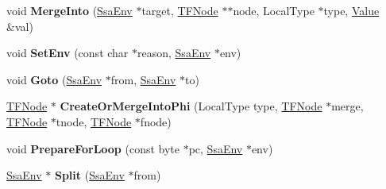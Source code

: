 \begin{DoxyCompactItemize}
\item 
void {\bfseries Merge\+Into} (\hyperlink{structv8_1_1internal_1_1wasm_1_1_ssa_env}{Ssa\+Env} $\ast$target, \hyperlink{classv8_1_1internal_1_1compiler_1_1_node}{T\+F\+Node} $\ast$$\ast$node, Local\+Type $\ast$type, \hyperlink{structv8_1_1internal_1_1wasm_1_1_value}{Value} \&val)\hypertarget{classv8_1_1internal_1_1wasm_1_1_s_r___wasm_decoder_a4cdc5f1be0f8b1665ae6cc0359b4a018}{}\label{classv8_1_1internal_1_1wasm_1_1_s_r___wasm_decoder_a4cdc5f1be0f8b1665ae6cc0359b4a018}

\item 
void {\bfseries Set\+Env} (const char $\ast$reason, \hyperlink{structv8_1_1internal_1_1wasm_1_1_ssa_env}{Ssa\+Env} $\ast$env)\hypertarget{classv8_1_1internal_1_1wasm_1_1_s_r___wasm_decoder_ac2c02325fd90668338166277f3f9b065}{}\label{classv8_1_1internal_1_1wasm_1_1_s_r___wasm_decoder_ac2c02325fd90668338166277f3f9b065}

\item 
void {\bfseries Goto} (\hyperlink{structv8_1_1internal_1_1wasm_1_1_ssa_env}{Ssa\+Env} $\ast$from, \hyperlink{structv8_1_1internal_1_1wasm_1_1_ssa_env}{Ssa\+Env} $\ast$to)\hypertarget{classv8_1_1internal_1_1wasm_1_1_s_r___wasm_decoder_a0c689e89f5fa08b5da3d5e004c7c4aac}{}\label{classv8_1_1internal_1_1wasm_1_1_s_r___wasm_decoder_a0c689e89f5fa08b5da3d5e004c7c4aac}

\item 
\hyperlink{classv8_1_1internal_1_1compiler_1_1_node}{T\+F\+Node} $\ast$ {\bfseries Create\+Or\+Merge\+Into\+Phi} (Local\+Type type, \hyperlink{classv8_1_1internal_1_1compiler_1_1_node}{T\+F\+Node} $\ast$merge, \hyperlink{classv8_1_1internal_1_1compiler_1_1_node}{T\+F\+Node} $\ast$tnode, \hyperlink{classv8_1_1internal_1_1compiler_1_1_node}{T\+F\+Node} $\ast$fnode)\hypertarget{classv8_1_1internal_1_1wasm_1_1_s_r___wasm_decoder_a79b5dfa65110dc17b14c0232b1ba75a1}{}\label{classv8_1_1internal_1_1wasm_1_1_s_r___wasm_decoder_a79b5dfa65110dc17b14c0232b1ba75a1}

\item 
void {\bfseries Prepare\+For\+Loop} (const byte $\ast$pc, \hyperlink{structv8_1_1internal_1_1wasm_1_1_ssa_env}{Ssa\+Env} $\ast$env)\hypertarget{classv8_1_1internal_1_1wasm_1_1_s_r___wasm_decoder_a8e0beb95cf55eefa06092966653c5187}{}\label{classv8_1_1internal_1_1wasm_1_1_s_r___wasm_decoder_a8e0beb95cf55eefa06092966653c5187}

\item 
\hyperlink{structv8_1_1internal_1_1wasm_1_1_ssa_env}{Ssa\+Env} $\ast$ {\bfseries Split} (\hyperlink{structv8_1_1internal_1_1wasm_1_1_ssa_env}{Ssa\+Env} $\ast$from)\hypertarget{classv8_1_1internal_1_1wasm_1_1_s_r___wasm_decoder_aef34b4f60ed81f0bb65a4d33beafdb17}{}\label{classv8_1_1internal_1_1wasm_1_1_s_r___wasm_decoder_aef34b4f60ed81f0bb65a4d33beafdb17}


\end{DoxyCompactItemize}
